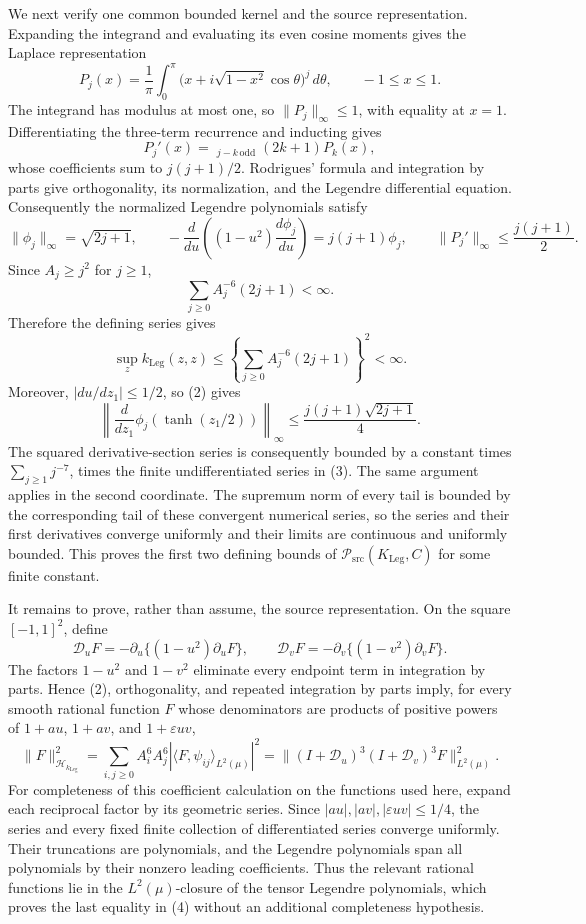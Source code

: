 We next verify one common bounded kernel and the source representation.  Expanding the integrand and evaluating its even cosine moments gives the Laplace representation
\[
 P_j(x)=\frac1\pi\int_0^\pi
 \bigl(x+i\sqrt{1-x^2}\cos\theta\bigr)^j\,d\theta,
 \qquad -1\le x\le1.
\]
The integrand has modulus at most one, so \(\|P_j\|_\infty\le1\), with equality at \(x=1\).  Differentiating the three-term recurrence and inducting gives
\[
 P_j'(x)=\mathop{\sum_{0\le k<j}}_{j-k\,\mathrm{odd}}(2k+1)P_k(x),
\]
whose coefficients sum to \(j(j+1)/2\).  Rodrigues' formula and integration by parts give orthogonality, its normalization, and the Legendre differential equation.  Consequently the normalized Legendre polynomials satisfy
\[
 \|\phi_j\|_{\infty}=\sqrt{2j+1},
 \qquad
 -\frac{d}{du}\!\left((1-u^2)\frac{d\phi_j}{du}\right)
 =j(j+1)\phi_j,
 \qquad
 \|P_j'\|_\infty\le\frac{j(j+1)}2.
 \tag{2}
\]
Since \(A_j\ge j^2\) for \(j\ge1\),
\[
 \sum_{j\ge0}A_j^{-6}(2j+1)<\infty.
\]
Therefore the defining series gives
\[
 \sup_z k_{\mathrm{Leg}}(z,z)
 \le\left\{\sum_{j\ge0}A_j^{-6}(2j+1)\right\}^2<\infty.
 \tag{3}
\]
Moreover, \(|du/dz_1|\le1/2\), so (2) gives
\[
 \left\|\frac{d}{dz_1}\phi_j(\tanh(z_1/2))\right\|_{\infty}
 \le\frac{j(j+1)\sqrt{2j+1}}4.
\]
The squared derivative-section series is consequently bounded by a constant times \(\sum_{j\ge1}j^{-7}\), times the finite undifferentiated series in (3).  The same argument applies in the second coordinate.  The supremum norm of every tail is bounded by the corresponding tail of these convergent numerical series, so the series and their first derivatives converge uniformly and their limits are continuous and uniformly bounded.  This proves the first two defining bounds of \(\mathcal P_{\mathrm{src}}(K_{\mathrm{Leg}},C)\) for some finite constant.

It remains to prove, rather than assume, the source representation.  On the square \([-1,1]^2\), define
\[
 \mathscr D_uF=-\partial_u\{(1-u^2)\partial_uF\},
 \qquad
 \mathscr D_vF=-\partial_v\{(1-v^2)\partial_vF\}.
\]
The factors \(1-u^2\) and \(1-v^2\) eliminate every endpoint term in integration by parts.  Hence (2), orthogonality, and repeated integration by parts imply, for every smooth rational function \(F\) whose denominators are products of positive powers of \(1+au\), \(1+av\), and \(1+\varepsilon uv\),
\[
 \|F\|_{\mathcal H_{k_{\mathrm{Leg}}}}^2
 =\sum_{i,j\ge0}A_i^6A_j^6|\langle F,\psi_{ij}\rangle_{L^2(\mu)}|^2
 =\|(I+\mathscr D_u)^3(I+\mathscr D_v)^3F\|_{L^2(\mu)}^2.
 \tag{4}
\]
For completeness of this coefficient calculation on the functions used here, expand each reciprocal factor by its geometric series.  Since \(|au|,|av|,|\varepsilon uv|\le1/4\), the series and every fixed finite collection of differentiated series converge uniformly.  Their truncations are polynomials, and the Legendre polynomials span all polynomials by their nonzero leading coefficients.  Thus the relevant rational functions lie in the \(L^2(\mu)\)-closure of the tensor Legendre polynomials, which proves the last equality in (4) without an additional completeness hypothesis.

